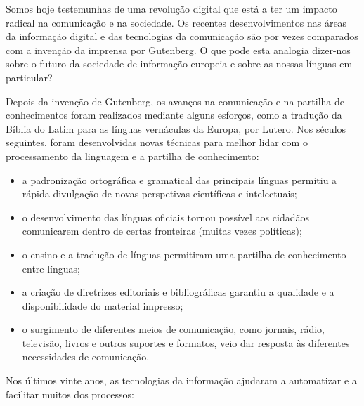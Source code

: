 \begin{multicols}{2}

Somos hoje testemunhas de uma revolução digital que está a ter um impacto radical na comunicação e na sociedade. Os recentes desenvolvimentos nas áreas da informação digital e das tecnologias da comunicação são por vezes comparados com a invenção da imprensa por Gutenberg. O que pode esta analogia dizer-nos sobre o futuro da sociedade de informação europeia e sobre as nossas línguas em particular?


Depois da invenção de Gutenberg, os avanços na comunicação e na partilha de conhecimentos foram realizados mediante alguns esforços, como a tradução da Bíblia do Latim para as línguas vernáculas da Europa, por Lutero. Nos séculos seguintes, foram desenvolvidas novas técnicas para melhor lidar com o processamento da linguagem e a partilha de co\-nhe\-ci\-men\-to:

\medskip
\begin{itemize}
   \item a padronização ortográfica e gramatical das principais línguas permitiu a rápida divulgação de novas perspetivas científicas e intelectuais;
      \item o desenvolvimento das línguas oficiais tornou possível aos cidadãos comunicarem dentro de certas fronteiras (muitas vezes políticas);
      \item o ensino e a tradução de línguas permitiram uma partilha de conhecimento entre línguas;
      \item a criação de diretrizes editoriais e bibliográficas garantiu a qualidade e a disponibilidade do material impresso;
      \item o surgimento de diferentes meios de comunicação, como jornais, rádio, televisão, livros e outros suportes e formatos, veio dar resposta às diferentes necessidades de comunicação. 
\end{itemize}

 Nos últimos vinte anos, as tecnologias da informação ajudaram a automatizar e a facilitar muitos dos processos:


\end{multicols}
